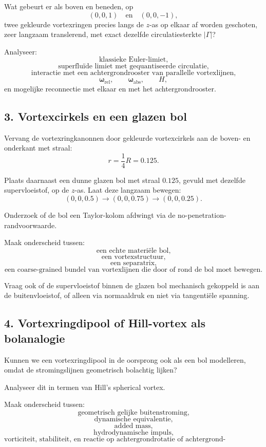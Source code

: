 \documentclass[11pt,a4paper]{article}
\begin{document}
Wat gebeurt er als boven en beneden, op
\[
(0,0,1)
\quad\text{en}\quad
(0,0,-1),
\]
twee gekleurde vortexringen precies langs de \(z\)-as op elkaar af worden geschoten, zeer langzaam translerend, met exact dezelfde circulatiesterkte \(|\Gamma|\)?

Analyseer:
\[
\text{klassieke Euler-limiet,}
\]
\[
\text{superfluïde limiet met gequantiseerde circulatie,}
\]
\[
\text{interactie met een achtergrondrooster van parallelle vortexlijnen,}
\]
\[
\boldsymbol{\omega}_{\mathrm{rel}},
\qquad
\boldsymbol{\omega}_{\mathrm{abs}},
\qquad
H,
\]
en mogelijke reconnectie met elkaar en met het achtergrondrooster.

\subsection{3. Vortexcirkels en een glazen bol}

Vervang de vortexringkanonnen door gekleurde vortexcirkels aan de boven- en onderkant met straal:
\[
r=\frac{1}{4}R=0.125.
\]

Plaats daarnaast een dunne glazen bol met straal \(0.125\), gevuld met dezelfde supervloeistof, op de \(z\)-as. Laat deze langzaam bewegen:
\[
(0,0,0.5)
\rightarrow
(0,0,0.75)
\rightarrow
(0,0,0.25).
\]

Onderzoek of de bol een Taylor-kolom afdwingt via de no-penetration-randvoorwaarde.

Maak onderscheid tussen:
\[
\text{een echte materiële bol,}
\]
\[
\text{een vortexstructuur,}
\]
\[
\text{een separatrix,}
\]
\[
\text{een coarse-grained bundel van vortexlijnen die door of rond de bol moet bewegen.}
\]

Vraag ook of de supervloeistof binnen de glazen bol mechanisch gekoppeld is aan de buitenvloeistof, of alleen via normaaldruk en niet via tangentiële spanning.

\subsection{4. Vortexringdipool of Hill-vortex als bolanalogie}

Kunnen we een vortexringdipool in de oorsprong ook als een bol modelleren, omdat de stromingslijnen geometrisch bolachtig lijken?

Analyseer dit in termen van Hill's spherical vortex.

Maak onderscheid tussen:
\[
\text{geometrisch gelijke buitenstroming,}
\]
\[
\text{dynamische equivalentie,}
\]
\[
\text{added mass,}
\]
\[
\text{hydrodynamische impuls,}
\]
\[
\text{vorticiteit, stabiliteit, en reactie op achtergrondrotatie of achtergrond-vortexlijnen.}
\]
\end{document}
